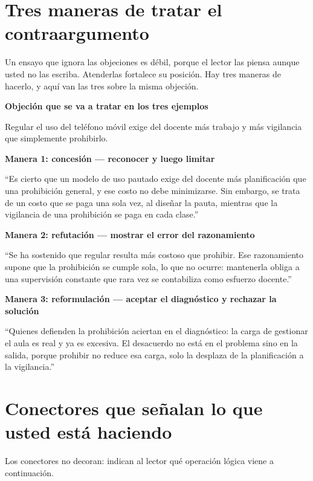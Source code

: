 \documentclass[12pt,a4paper,openany]{report}
\newenvironment{ejemplo}[1]
	{\begin{lrbox}{\cajaguardada}\begin{minipage}{\dimexpr\textwidth-2\fboxsep\relax}\vspace{4pt}\textcolor{verdeejemplo}{\textbf{\sffamily\small #1}}\par\vspace{3pt}\small}
	{\vspace{4pt}\end{minipage}\end{lrbox}\par\vspace{4pt}\noindent\colorbox{cremaejemplo}{\usebox{\cajaguardada}}\par\vspace{8pt}}
\newenvironment{aviso}[1]
	{\begin{lrbox}{\cajaguardada}\begin{minipage}{\dimexpr\textwidth-2\fboxsep\relax}\vspace{4pt}\textbf{\sffamily\small #1}\par\vspace{3pt}\small}
	{\vspace{4pt}\end{minipage}\end{lrbox}\par\vspace{4pt}\noindent\colorbox{grisclaro}{\usebox{\cajaguardada}}\par\vspace{8pt}}
\begin{document}
\section{Tres maneras de tratar el contraargumento}

Un ensayo que ignora las objeciones es d\'ebil, porque el lector las piensa aunque usted no las escriba. Atenderlas fortalece su posici\'on. Hay tres maneras de hacerlo, y aqu\'i van las tres sobre la misma objeci\'on.

\begin{aviso}{Objeci\'on que se va a tratar en los tres ejemplos}
Regular el uso del tel\'efono m\'ovil exige del docente m\'as trabajo y m\'as vigilancia que simplemente prohibirlo.
\end{aviso}

\begin{ejemplo}{Manera 1: concesi\'on --- reconocer y luego limitar}
``Es cierto que un modelo de uso pautado exige del docente m\'as planificaci\'on que una prohibici\'on general, y ese costo no debe minimizarse. Sin embargo, se trata de un costo que se paga una sola vez, al dise\~nar la pauta, mientras que la vigilancia de una prohibici\'on se paga en cada clase.''
\end{ejemplo}

\begin{ejemplo}{Manera 2: refutaci\'on --- mostrar el error del razonamiento}
``Se ha sostenido que regular resulta m\'as costoso que prohibir. Ese razonamiento supone que la prohibici\'on se cumple sola, lo que no ocurre: mantenerla obliga a una supervisi\'on constante que rara vez se contabiliza como esfuerzo docente.''
\end{ejemplo}

\begin{ejemplo}{Manera 3: reformulaci\'on --- aceptar el diagn\'ostico y rechazar la soluci\'on}
``Quienes defienden la prohibici\'on aciertan en el diagn\'ostico: la carga de gestionar el aula es real y ya es excesiva. El desacuerdo no est\'a en el problema sino en la salida, porque prohibir no reduce esa carga, solo la desplaza de la planificaci\'on a la vigilancia.''
\end{ejemplo}

\section{Conectores que se\~nalan lo que usted est\'a haciendo}

Los conectores no decoran: indican al lector qu\'e operaci\'on l\'ogica viene a continuaci\'on.
\end{document}
